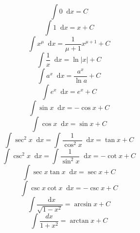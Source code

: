 \documentclass[]{article}
\newcommand*{\dif}{\mathop{}\!\mathrm{d}}
\numberwithin{equation}{section}
\begin{document}
\section{}
\begin{equation}
    \int0\dif x=C
\end{equation}
\begin{equation}
    \int1\dif x=x+C
\end{equation}
\begin{equation}
    \int x^\mu\dif x=\frac{1}{\mu+1}x^{\mu+1}+C
\end{equation}
\begin{equation}
    \int\frac{1}{x}\dif x=\ln\left|x\right|+C
\end{equation}
\begin{equation}
    \int a^x\dif x=\frac{a^x}{\ln a}+C
\end{equation}
\begin{equation}
    \int e^x\dif x=e^x+C
\end{equation}
\begin{equation}
    \int\sin x\dif x=-\cos x+C
\end{equation}
\begin{equation}
    \int\cos x\dif x=\sin x+C
\end{equation}
\begin{equation}
    \int\sec^2x\dif x=\int\frac{1}{\cos^2x}\dif x=\tan x+C
\end{equation}
\begin{equation}
    \int\csc^2x\dif x=\int\frac{1}{\sin^2x}\dif x=-\cot x+C
\end{equation}
\begin{equation}
    \int\sec x\tan x\dif x=\sec x+C
\end{equation}
\begin{equation}
    \int\csc x\cot x\dif x=-\csc x+C
\end{equation}
\begin{equation}
    \int\frac{\dif x}{\sqrt{1-x^2}}=\arcsin x+C
\end{equation}
\begin{equation}
    \int\frac{dx}{1+x^2}=\arctan x+C
\end{equation}
\end{document}
